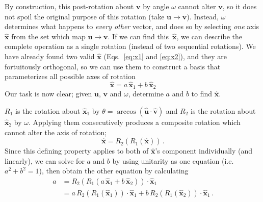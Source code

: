 \documentclass{article}
\renewcommand{\vec}[1]{\boldsymbol{#1}}
\newcommand{\vecN}[1]{\vec{\hat{#1}}}
\newcommand{\ds}{^{}}
\newcommand{\ax}{\vecN{x}}
\begin{document}
By construction, this post-rotation about $\vec{v}$ by angle $\omega$ 
cannot alter $\vec{v}$, so it does not spoil
the original purpose of this rotation (take $\vec{u}\to\vec{v}$).
Instead, $\omega$ determines what happens to \emph{every other} vector, 
and does so by selecting \emph{one} axis $\ax$ from the set which map $\vec{u}\to\vec{v}$.
If we can find this~$\ax$, we can describe the complete operation as a single rotation 
(instead of two sequential rotations).
We have already found two valid $\ax$ (Eqs.~\ref{eq:x1} and \ref{eq:x2}), 
and they are fortuitously orthogonal, so we can use them to construct
a basis that parameterizes all possible axes of rotation
\begin{equation}
	\ax = a\,\ax_1\ds + b\,\ax_2\ds
\end{equation}
Our task is now clear; given $\vec{u}$, $\vec{v}$ and $\omega$, 
determine $a$ and $b$ to find $\ax$.

$R_1\ds$ is the rotation about $\ax_1\ds$
by $\theta=\arccos(\vecN{u}\cdot\vecN{v})$ and $R_2\ds$ is the rotation about $\ax_2\ds$ by $\omega$.
Applying them consecutively produces a composite rotation
which cannot alter the axis of rotation;
\begin{equation}
	\ax = R_2\ds(R_1\ds(\ax))\,.
\end{equation}
Since this defining property applies to both of $\ax$'s component individually (and linearly), 
we can solve for $a$ and $b$ by using unitarity as one equation (i.e.\ ${a^2+b^2=1}$), 
then obtain the other equation by calculating
\begin{align}\label{eq:a}
	a & = R_2\ds(R_1\ds(a\,\ax_1\ds + b\,\ax_2\ds))\cdot\ax_1\ds\nonumber\\
		& = a\,R_2\ds(R_1\ds(\ax_1\ds))\cdot\ax_1\ds + b\,R_2\ds(R_1\ds(\ax_2\ds))\cdot\ax_1\ds\,.
\end{align}
\end{document}
